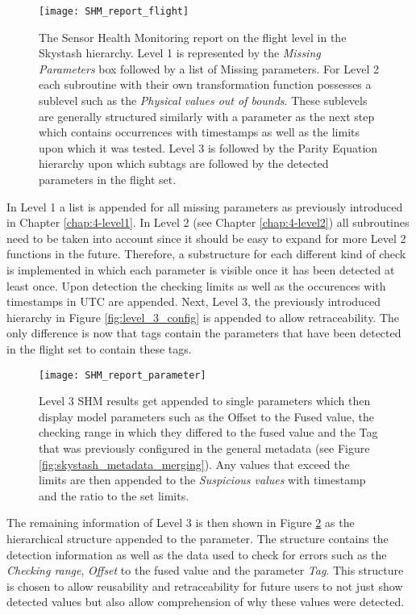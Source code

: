 \begin{figure}[!b]
    \centering
    \texttt{[image: SHM\_report\_flight]}
    \caption[SHM-report structure on flight level]{The Sensor Health Monitoring report on the flight level in the Skystash hierarchy. Level 1 is represented by the \textit{Missing Parameters} box followed by a list of Missing parameters. For Level 2 each subroutine with their own transformation function possesses a sublevel such as the \textit{Physical values out of bounds}. These sublevels are generally structured similarly with a parameter as the next step which contains occurrences with timestamps as well as the limits upon which it was tested. Level 3 is followed by the Parity Equation hierarchy upon which subtags are followed by the detected parameters in the flight set.}
    \label{fig:SHM_report_flight}
\end{figure}

In Level 1 a list is appended for all missing parameters as previously introduced in Chapter \ref{chap:4-level1}. In Level 2 (see Chapter \ref{chap:4-level2}) all subroutines need to be taken into account since it should be easy to expand for more Level 2 functions in the future. Therefore, a substructure for each different kind of check is implemented in which each parameter is visible once it has been detected at least once. Upon detection the checking limits as well as the occurences with timestamps in UTC are appended. Next, Level 3, the previously introduced hierarchy in Figure \ref{fig:level_3_config} is appended to allow retraceability. The only difference is now that tags contain the parameters that have been detected in the flight set to contain these tags.
\begin{figure}[!h]
    \centering
    \texttt{[image: SHM\_report\_parameter]}
    \caption[SHM-report structure on parameter level for Level 3]{Level 3 SHM results get appended to single parameters which then display model parameters such as the Offset to the Fused value, the checking range in which they differed to the fused value and the Tag that was previously configured in the general metadata (see Figure \ref{fig:skystash_metadata_merging}). Any values that exceed the limits are then appended to the \textit{Suspicious values} with timestamp and the ratio to the set limits.}
    \label{fig:SHM_report_parameter}
\end{figure}
The remaining information of Level 3 is then shown in Figure \ref{fig:SHM_report_parameter} as the hierarchical structure appended to the parameter. The structure contains the detection information as well as the data used to check for errors such as the \textit{Checking range}, \textit{Offset} to the fused value and the parameter \textit{Tag}. This structure is chosen to allow reusability and retraceability for future users to not just show detected values but also allow comprehension of why these values were detected.





